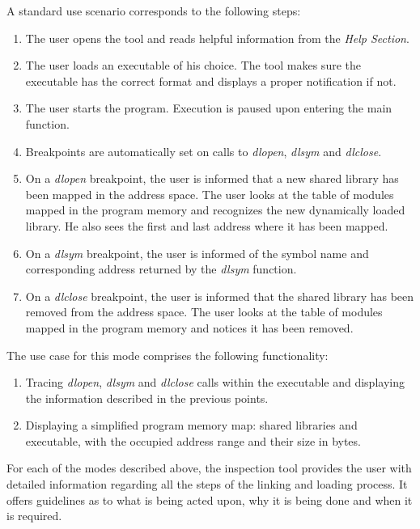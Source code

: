 A standard use scenario corresponds to the following steps:
\begin{enumerate}
\item The user opens the tool and reads helpful information from the \textit{Help Section}.
\item The user loads an executable of his choice. The tool makes sure the executable has the correct format and displays a proper notification if not.
\item The user starts the program. Execution is paused upon entering the main function.
\item Breakpoints are automatically set on calls to \textit{dlopen}, \textit{dlsym} and \textit{dlclose}.
\item On a \textit{dlopen} breakpoint, the user is informed that a new shared library has been mapped in the address space. The user looks at the table of modules mapped in the program memory and recognizes the new dynamically loaded library. He also sees the first and last address where it has been mapped.
\item On a \textit{dlsym} breakpoint, the user is informed of the symbol name and corresponding address returned by the \textit{dlsym} function.
\item On a \textit{dlclose} breakpoint, the user is informed that the shared library has been removed from the address space. The user looks at the table of modules mapped in the program memory and notices it has been removed.
\end{enumerate}

The use case for this mode comprises the following functionality:
\begin{enumerate}
\item Tracing \textit{dlopen}, \textit{dlsym} and \textit{dlclose} calls within the executable and displaying the information described in the previous points.
\item Displaying a simplified program memory map: shared libraries and executable, with the occupied address range and their size in bytes.
\end{enumerate}

For each of the modes described above, the inspection tool provides the user with detailed information regarding all the steps of the linking and loading process. It offers guidelines as to what is being acted upon, why it is being done and when it is required.